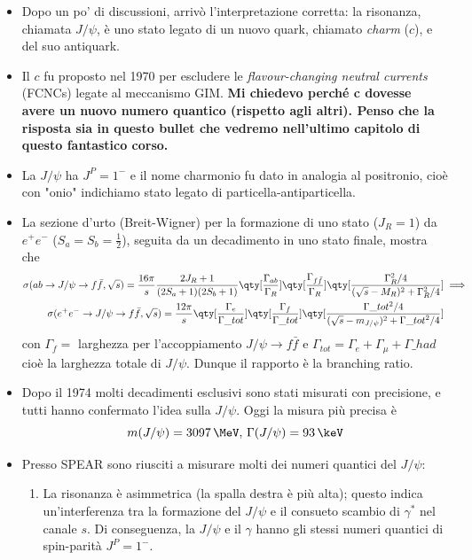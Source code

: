 \begin{itemize}
    \item Dopo un po' di discussioni, arrivò l'interpretazione corretta: la risonanza, chiamata $J/\psi$, è uno stato legato di un nuovo quark, chiamato \textit{charm} ($c$), e del suo antiquark. 
    \item Il $c$ fu proposto nel 1970 per escludere le \textit{flavour-changing neutral currents} (FCNCs) legate al meccanismo GIM. \textbf{Mi chiedevo perché c dovesse avere un nuovo numero quantico (rispetto agli altri). Penso che la risposta sia in questo bullet che vedremo nell'ultimo capitolo di questo fantastico corso.}
    \item La $J/\psi$ ha $J^P=1^-$ e il nome charmonio fu dato in analogia al positronio, cioè con "onio" indichiamo stato legato di particella-antiparticella.
    \item La sezione d'urto (Breit-Wigner) per la formazione di uno stato ($J_R=1$) da $e^+e^-$ ($S_a=S_b=\frac12$), seguita da un decadimento in uno stato finale, mostra che
    \begin{gather*}
    \sigma(ab\to J/\psi\to f\bar f,\sqrt s)=\frac{16\pi}s\frac{2J_R+1}{(2S_a+1)(2S_b+1)}\qty[\frac{\Gamma_{ab}}{\Gamma_R}]\qty[\frac{\Gamma_{f\bar f}}{\Gamma_R}]\qty[\frac{\Gamma_R^2/4}{(\sqrt s-M_R)^2+\Gamma_R^2/4}]\implies\\
    \sigma(e^+e^-\to J/\psi\to f\bar f,\sqrt s)=\frac{12\pi}s\qty[\frac{\Gamma_{e}}{\Gamma\_{tot}}]\qty[\frac{\Gamma_f}{\Gamma\_{tot}}]\qty[\frac{\Gamma\_{tot}^2/4}{(\sqrt s-m_{J/\psi})^2+\Gamma\_{tot}^2/4}]
    \end{gather*}
    con $\Gamma_f=$ larghezza per l'accoppiamento $J/\psi\to f\bar f$ e $\Gamma_{tot}=\Gamma_e+\Gamma_\mu+\Gamma\_{had}$ cioè la larghezza totale di $J/\psi$. Dunque il rapporto è la branching ratio.
    \item Dopo il 1974 molti decadimenti esclusivi sono stati misurati con precisione, e tutti hanno confermato l'idea sulla $J/\psi$. Oggi la misura più precisa è 
    \begin{equation*}
        m(J/\psi)=3097\,\MeV,\,\Gamma(J/\psi)=93\,\keV
    \end{equation*}
    \item Presso SPEAR sono riusciti a misurare molti dei numeri quantici del $J/\psi$: 
    \begin{enumerate}
        \item La risonanza è asimmetrica (la spalla destra è più alta); questo indica un'interferenza tra la formazione del $J/\psi$ e il consueto scambio di $\gamma^*$ nel canale $s$. Di conseguenza, la $J/\psi$ e il $\gamma$ hanno gli stessi numeri quantici di spin-parità $J^P=1^-$.

\end{enumerate}
\end{itemize}
